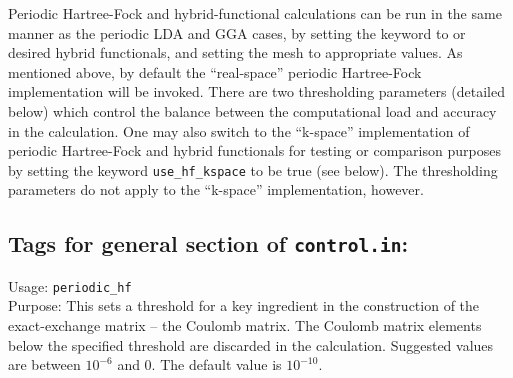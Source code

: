 Periodic Hartree-Fock and hybrid-functional calculations can be run
in the same manner as the periodic LDA and GGA cases, by setting the keyword 
 to  or desired hybrid functionals, and setting the 
 mesh to appropriate values. As mentioned above, by default
the ``real-space'' periodic Hartree-Fock implementation will be invoked. There are two
thresholding parameters (detailed below) which control the balance between the 
computational load and accuracy in the calculation.  One may also switch to the 
``k-space'' implementation of periodic Hartree-Fock and hybrid functionals for testing or 
comparison purposes by setting the keyword \texttt{use\_hf\_kspace} to be true 
(see below).  The thresholding parameters do not apply to the ``k-space'' implementation,
however.

\newpage

\subsection*{Tags for general section of \texttt{control.in}:}

{ \noindent
  Usage: \texttt{periodic\_hf}   \\[1.0ex]
  Purpose: This sets a threshold  for a key ingredient in the construction
  of the exact-exchange matrix -- the Coulomb matrix. 
  The Coulomb matrix elements below the specified threshold
   are discarded in the calculation. Suggested values
  are between $10^{-6}$ and 0. The default value is $10^{-10}$.
}

